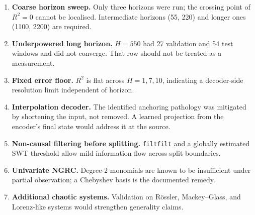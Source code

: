 \documentclass[11pt,a4paper]{article}
\begin{document}
\begin{enumerate}[leftmargin=*]
  \item \textbf{Coarse horizon sweep.} Only three horizons were run; the crossing point of $R^2 = 0$ cannot be localised. Intermediate horizons (55, 220) and longer ones (1100, 2200) are required.
  \item \textbf{Underpowered long horizon.} $H = 550$ had 27 validation and 54 test windows and did not converge. That row should not be treated as a measurement.
  \item \textbf{Fixed error floor.} $R^2$ is flat across $H = 1, 7, 10$, indicating a decoder-side resolution limit independent of horizon.
  \item \textbf{Interpolation decoder.} The identified anchoring pathology was mitigated by shortening the input, not removed. A learned projection from the encoder's final state would address it at the source.
  \item \textbf{Non-causal filtering before splitting.} \texttt{filtfilt} and a globally estimated SWT threshold allow mild information flow across split boundaries.
  \item \textbf{Univariate NGRC.} Degree-2 monomials are known to be insufficient under partial observation; a Chebyshev basis is the documented remedy.
  \item \textbf{Additional chaotic systems.} Validation on R\"ossler, Mackey--Glass, and Lorenz-like systems would strengthen generality claims.
\end{enumerate}
\end{document}
